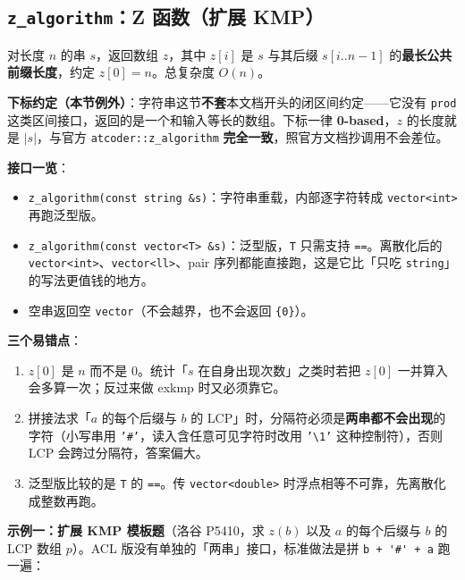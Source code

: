 		\subsection{\texttt{z\_algorithm}：Z 函数（扩展 KMP）}

		对长度 $n$ 的串 $s$，返回数组 $z$，其中 $z[i]$ 是 $s$ 与其后缀 $s[i..n-1]$ 的\textbf{最长公共前缀长度}，约定 $z[0] = n$。总复杂度 $O(n)$。

		\textbf{下标约定（本节例外）}：字符串这节\textbf{不套}本文档开头的闭区间约定——它没有 \texttt{prod} 这类区间接口，返回的是一个和输入等长的数组。下标一律 \textbf{0-based}，$z$ 的长度就是 $|s|$，与官方 \texttt{atcoder::z\_algorithm} \textbf{完全一致}，照官方文档抄调用不会差位。

		\textbf{接口一览}：

		\begin{itemize}
			\item \texttt{z\_algorithm(const string \&s)}：字符串重载，内部逐字符转成 \texttt{vector<int>} 再跑泛型版。
			\item \texttt{z\_algorithm(const vector<T> \&s)}：泛型版，\texttt{T} 只需支持 \texttt{==}。离散化后的 \texttt{vector<int>}、\texttt{vector<ll>}、pair 序列都能直接跑，这是它比「只吃 \texttt{string}」的写法更值钱的地方。
			\item 空串返回空 \texttt{vector}（不会越界，也不会返回 \texttt{\{0\}}）。
		\end{itemize}

		\textbf{三个易错点}：

		\begin{enumerate}
			\item $z[0]$ 是 $n$ 而不是 $0$。统计「$s$ 在自身出现次数」之类时若把 $z[0]$ 一并算入会多算一次；反过来做 exkmp 时又必须靠它。
			\item 拼接法求「$a$ 的每个后缀与 $b$ 的 LCP」时，分隔符必须是\textbf{两串都不会出现}的字符（小写串用 \texttt{'\#'}，读入含任意可见字符时改用 \texttt{'\textbackslash 1'} 这种控制符），否则 LCP 会跨过分隔符，答案偏大。
			\item 泛型版比较的是 \texttt{T} 的 \texttt{==}。传 \texttt{vector<double>} 时浮点相等不可靠，先离散化成整数再跑。
		\end{enumerate}

		\textbf{示例一：扩展 KMP 模板题}（洛谷 P5410，求 $z(b)$ 以及 $a$ 的每个后缀与 $b$ 的 LCP 数组 $p$）。ACL 版没有单独的「两串」接口，标准做法是拼 \verb|b + '#' + a| 跑一遍：

